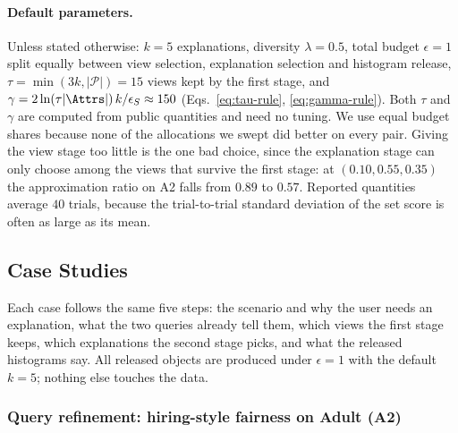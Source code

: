 \paragraph{Default parameters.}
Unless stated otherwise: $k=5$ explanations, diversity $\lambda=0.5$, total budget $\epsilon=1$ split equally between view selection, explanation selection and histogram release, $\tau=\min(3k,|\mathcal P|)=15$ views kept by the first stage, and $\gamma=2\ln(\tau|\Attrs|)\,k/\epsilon_S\approx150$ (Eqs.~\eqref{eq:tau-rule}, \eqref{eq:gamma-rule}).
Both $\tau$ and $\gamma$ are computed from public quantities and need no tuning.
We use equal budget shares because none of the allocations we swept did better on every pair. Giving the view stage too little is the one bad choice, since the explanation stage can only choose among the views that survive the first stage: at $(0.10,0.55,0.35)$ the approximation ratio on A2 falls from $0.89$ to $0.57$.
Reported quantities average $40$ trials, because the trial-to-trial standard deviation of the set score is often as large as its mean.

\subsection{Case Studies}
\label{sec:usecase-results}

Each case follows the same five steps: the scenario and why the user needs an explanation, what the two queries already tell them, which views the first stage keeps, which explanations the second stage picks, and what the released histograms say. All released objects are produced under $\epsilon=1$ with the default $k=5$; nothing else touches the data.

\subsubsection{Query refinement: hiring-style fairness on Adult (A2)}
\label{subsec:case-refinement}

